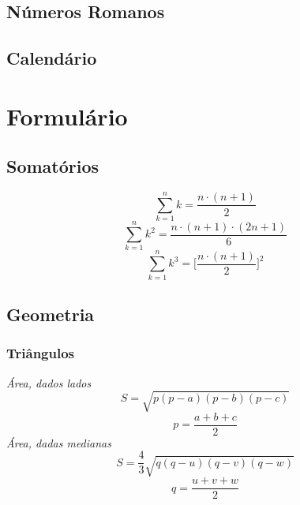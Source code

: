 \documentclass[12pt,a4paper]{article}
\begin{document}
		\subsection{Números Romanos}
			
		\subsection{Calendário}
			

	\twocolumn
	\section{Formulário}
		\subsection{Somatórios}
			\[ \sum_{k = 1}^{n} k = \frac{n \cdot (n + 1)}{2} \]
			\[ \sum_{k = 1}^{n} k^2 = \frac{n \cdot (n + 1) \cdot (2n + 1)}{6} \]
			\[ \sum_{k = 1}^{n} k^3 = \bigg[\frac{n \cdot (n + 1)}{2}\bigg]^2 \]
		\subsection{Geometria}
			\subsubsection{Triângulos}
				\emph{Área, dados lados}
				\[ S = \sqrt{p (p - a) (p - b) (p - c)} \]
				\[ p = \frac{a + b + c}{2} \]
				\emph{Área, dadas medianas}
				\[ S = \frac{4}{3} \sqrt{q (q - u) (q - v) (q - w)} \]
				\[ q = \frac{u + v + w}{2} \]
\end{document}
